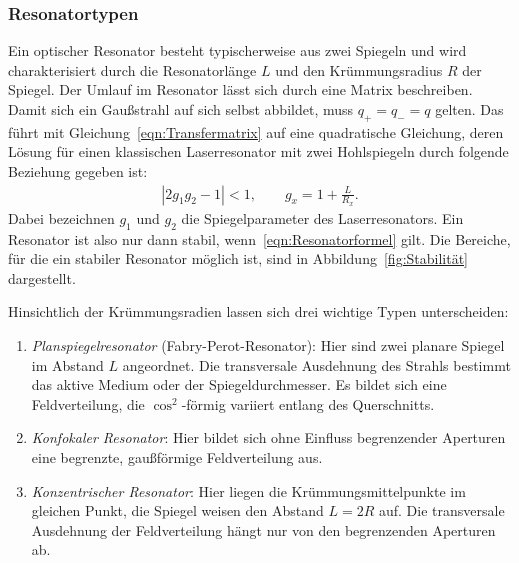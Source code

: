 \documentclass[a4paper,twoside,final]{article}
\begin{document}
\subsubsection{Resonatortypen}
Ein optischer Resonator besteht typischerweise aus zwei Spiegeln und wird charakterisiert durch die Resonatorlänge $L$ und den Krümmungsradius $R$ der Spiegel. Der Umlauf im Resonator lässt sich durch eine Matrix beschreiben. Damit sich ein Gaußstrahl auf sich selbst abbildet, muss $q_+ = q_- = q$ gelten. Das führt mit Gleichung~\eqref{eqn:Transfermatrix} auf eine quadratische Gleichung, deren Lösung für einen klassischen Laserresonator mit zwei Hohlspiegeln durch folgende Beziehung gegeben ist:
\begin{align}\label{eqn:Resonatorformel}
  |2g_1 g_2 -1 | < 1, \qquad g_x = 1 + \frac{L}{R_x}.
\end{align}
Dabei bezeichnen $g_1$ und $g_2$ die Spiegelparameter des Laserresonators. Ein Resonator ist also nur dann stabil, wenn~\eqref{eqn:Resonatorformel} gilt. Die Bereiche, für die ein stabiler Resonator möglich ist, sind in Abbildung~\ref{fig:Stabilität} dargestellt.



Hinsichtlich der Krümmungsradien lassen sich drei wichtige Typen unterscheiden:

\begin{enumerate}[label=\Alph*)]
  \item \emph{Planspiegelresonator} (Fabry-Perot-Resonator): Hier sind zwei planare Spiegel im Abstand $L$ angeordnet. Die transversale Ausdehnung des Strahls bestimmt das aktive Medium oder der Spiegeldurchmesser. Es bildet sich eine Feldverteilung, die $\cos^2$-förmig variiert entlang des Querschnitts.
  \item \emph{Konfokaler Resonator}: Hier bildet sich ohne Einfluss begrenzender Aperturen eine begrenzte, gaußförmige Feldverteilung aus.
  \item \emph{Konzentrischer Resonator}: Hier liegen die Krümmungsmittelpunkte im gleichen Punkt, die Spiegel weisen den Abstand $L=2R$ auf. Die transversale Ausdehnung der Feldverteilung hängt nur von den begrenzenden Aperturen ab.
\end{enumerate}
\end{document}
